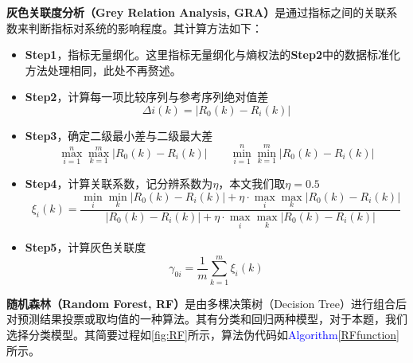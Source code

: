\documentclass{MathorCupmodeling}
\begin{document}
\newpage
	\textbf{灰色关联度分析（Grey Relation Analysis, GRA）}是通过指标之间的关联系数来判断指标对系统的影响程度\textcolor{blue}{\cite{pgrey1}}。其计算方法如下：
	\begin{itemize}
		\item \textbf{Step1}，指标无量纲化。这里指标无量纲化与熵权法的\textbf{Step2}中的数据标准化方法处理相同，此处不再赘述。
		\item \textbf{Step2}，计算每一项比较序列与参考序列绝对值差
		\begin{equation}
			\Delta i\left(k\right)=\left|R_0\left(k\right)-R_i\left(k\right)\right| \label{fDeltaik}
		\end{equation}
		\item \textbf{Step3}，确定二级最小差与二级最大差
		\begin{equation}
			\underset{i=1}{\overset{n}{\max}}\underset{k=1}{\overset{m}{\max}}\left| R_0\left( k \right) -R_i\left( k \right) \right| \qquad \underset{i=1}{\overset{n}{\min}}\underset{k=1}{\overset{m}{\min}}\left| R_0\left( k \right) -R_i\left( k \right) \right| \label{fmaxmaxminmin}
		\end{equation}

		\item \textbf{Step4}，计算关联系数，记分辨系数为$\eta$，本文我们取$\eta=0.5$
		\begin{equation}
			\xi_i\left(k\right)=\frac{\underset{i}{\min}\underset{k}{\min}\left| R_0\left( k \right) -R_i\left( k \right) \right|+\eta \cdot \underset{i}{\max}\underset{k}{\max}\left| R_0\left( k \right) -R_i\left( k \right) \right|}{\left| R_0\left( k \right) -R_i\left( k \right) \right|+\eta \cdot \underset{i}{\max}\underset{k}{\max}\left| R_0\left( k \right) -R_i\left( k \right) \right|} \label{fxi}
		\end{equation}
		\item \textbf{Step5}，计算灰色关联度
		\begin{equation}
			\gamma_{0i}=\frac{1}{m}\sum\limits_{k=1}^{m}\xi_i\left(k\right) \label{fgamma}
		\end{equation}
	\end{itemize}

	\textbf{随机森林（Random Forest, RF）}是由多棵决策树（Decision Tree）进行组合后对预测结果投票或取均值的一种算法\textcolor{blue}{\cite{prf}}。其有分类和回归两种模型，对于本题，我们选择分类模型。其简要过程如\textcolor{blue}{\cref{fig:RF}}所示，算法伪代码如\textcolor{blue}{Algorithm\ref{RFfunction}}所示。
	
\end{document}
